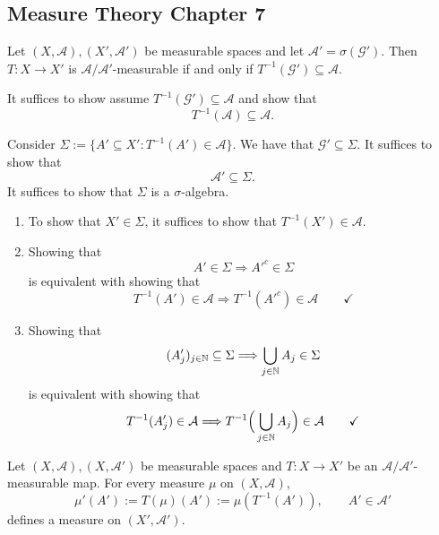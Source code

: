 \subsection{Measure Theory Chapter 7}

\begin{prop}
Let \((X,\mathcal{A}),(X',\mathcal{A}')\) be measurable spaces and let \(\mathcal{A}'=\sigma (\mathcal{G}').\) Then \(T:X\rightarrow X'\) is \(\mathcal{A}/\mathcal{A}'\)-measurable if and only if \(T^{-1}(\mathcal{G}')\subseteq \mathcal{A}.\)
\end{prop}

It suffices to show assume \(T^{-1}(\mathcal{G}')\subseteq \mathcal{A}\) and show that
\[
T^{-1}(\mathcal{A})\subseteq \mathcal{A}.
\]

Consider \(\Sigma :=\{A'\subseteq X' : T^{-1}(A')\in \mathcal{A}\}\). We have that \(\mathcal{G}'\subseteq \Sigma \). It suffices to show that
\[
\mathcal{A}'\subseteq \Sigma .
\]
It suffices to show that \(\Sigma \) is a \(\sigma \)-algebra.

\begin{enumerate}
  \item To show that \(X'\in \Sigma \), it suffices to show that \(T^{-1}(X')\in \mathcal{A}\).
  \item Showing that
\[
A'\in \Sigma  \Longrightarrow  A'^c\in \Sigma 
\]
is equivalent with showing that
\[
T^{-1}(A')\in \mathcal{A} \Longrightarrow  T^{-1}(A'^c)\in \mathcal{A} \qquad\checkmark
\]
  \item Showing that
\[
(A_{j}')_{j\in \Bbb{N}}\subseteq \Sigma  \Longrightarrow  \bigcup _{j\in \Bbb{N}}A_{j}\in \Sigma 
\]
is equivalent with showing that
\[
T^{-1}(A_{j}')\in \mathcal{A}\Longrightarrow T^{-1}\Big(\bigcup _{j\in \Bbb{N}}A_{j}\Big)\in \mathcal{A} \qquad\checkmark
\]
\end{enumerate}

\begin{prop}
Let \((X,\mathcal{A}),(X,\mathcal{A}')\) be measurable spaces and \(T:X\rightarrow X'\) be an \(\mathcal{A}/\mathcal{A}'\)-measurable map. For every measure \(\mu \) on \((X,\mathcal{A})\),
\[
\mu '(A'):=T(\mu )(A'):=\mu (T^{-1}(A')), \qquad A'\in \mathcal{A}'
\]
defines a measure on \((X',\mathcal{A}').\)
\end{prop}

